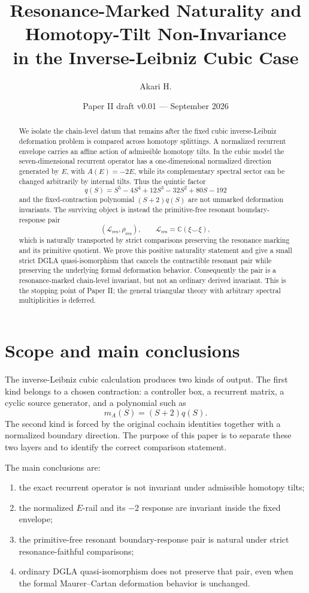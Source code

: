 \documentclass[11pt]{amsart}
\title[Resonance-Marked Naturality]{Resonance-Marked Naturality and Homotopy-Tilt Non-Invariance\\
in the Inverse-Leibniz Cubic Case}
\author{Akari H.}
\date{Paper II draft v0.01 --- September 2026}
\newcommand{\C}{\mathbb C}
\begin{document}
\begin{abstract}
We isolate the chain-level datum that remains after the fixed cubic inverse-Leibniz deformation problem is compared across homotopy splittings.  A normalized recurrent envelope carries an affine action of admissible homotopy tilts.  In the cubic model the seven-dimensional recurrent operator has a one-dimensional normalized direction generated by \(E\), with \(A(E)=-2E\), while its complementary spectral sector can be changed arbitrarily by internal tilts.  Thus the quintic factor
\[
q(S)=S^5-4S^4+12S^3-32S^2+80S-192
\]
and the fixed-contraction polynomial \((S+2)q(S)\) are not unmarked deformation invariants.  The surviving object is instead the primitive-free resonant boundary-response pair
\[
(\mathcal L_{\mathrm{res}},\rho_{\mathrm{res}}),
\qquad
\mathcal L_{\mathrm{res}}=\C(\xi\smile\xi),
\]
which is naturally transported by strict comparisons preserving the resonance marking and its primitive quotient.  We prove this positive naturality statement and give a small strict DGLA quasi-isomorphism that cancels the contractible resonant pair while preserving the underlying formal deformation behavior.  Consequently the pair is a resonance-marked chain-level invariant, but not an ordinary derived invariant.  This is the stopping point of Paper II; the general triangular theory with arbitrary spectral multiplicities is deferred.
\end{abstract}

\maketitle
\tableofcontents

\section{Scope and main conclusions}

The inverse-Leibniz cubic calculation produces two kinds of output.  The first kind belongs to a chosen contraction: a controller box, a recurrent matrix, a cyclic source generator, and a polynomial such as
\[
m_A(S)=(S+2)q(S).
\]
The second kind is forced by the original cochain identities together with a normalized boundary direction.  The purpose of this paper is to separate these two layers and to identify the correct comparison statement.

The main conclusions are:

\begin{enumerate}[label=(\roman*)]
\item the exact recurrent operator is not invariant under admissible homotopy tilts;
\item the normalized \(E\)-rail and its \(-2\) response are invariant inside the fixed envelope;
\item the primitive-free resonant boundary-response pair is natural under strict resonance-faithful comparisons;
\item ordinary DGLA quasi-isomorphism does not preserve that pair, even when the formal Maurer--Cartan deformation behavior is unchanged.
\end{enumerate}
\end{document}
